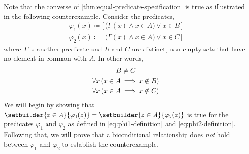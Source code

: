 \begin{rem}
    Note that the converse of \cref{thm:equal-predicate-specification}
    is  true as illustrated in the following counterexample.
    Consider the predicates,
    \begin{gather}
        \varphi_{1}(x) \coloneq
        \Big[\, \big( \Gamma(x) \land x \in A \big)
        \lor x \in B \,\Big] \label{eq:phi1-definition} \\
        \varphi_{2}(x) \coloneq
        \Big[\, \big( \Gamma(x) \land x \in A \big)
        \lor x \in C \,\Big] \label{eq:phi2-definition}
    \end{gather}
    where \( \Gamma \) is another predicate and \( B \) and \( C \) are distinct,
    non-empty sets that have no element in common with \( A \). In other words,
    \begin{gather}
        B \neq C \label{eq:B-C-Not-Equal} \\
        \forall x \, \mleft( x \in A \implies x \notin B \mright) \label{eq:A-B-no-common-elements} \\
        \forall x \, \mleft( x \in A \implies x \notin C \mright) \label{eq:A-C-no-common-elements}
    \end{gather}
    We will begin by showing that \( \setbuilder{z \in A}{\varphi_{1}(z)} = \setbuilder{z \in A}{\varphi_{2}(z)} \)
    is true for the predicates \( \varphi_{1} \) and \( \varphi_{2} \) as defined in
    \eqref{eq:phi1-definition} and \eqref{eq:phi2-definition}.
    Following that, we will prove that a biconditional relationship does \emph{not} hold between \( \varphi_{1} \) and
    \( \varphi_{2} \) to establish the counterexample.


\end{rem}
